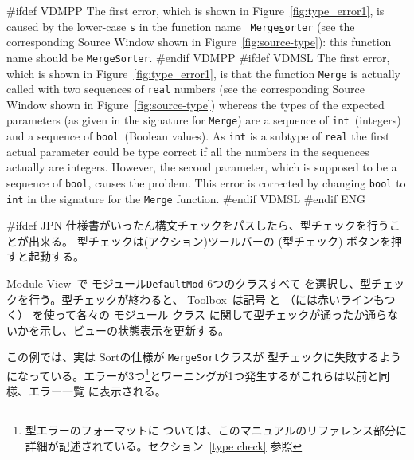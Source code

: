 \documentclass[\pformat,12pt]{article}
\newcommand{\Toolbox}{Toolbox}
\newcommand{\vdmModView}{\guicmd{Module View}}
\newcommand{\vdmModView}{\guicmd{モジュールビュー}}
\newcommand{\Toolbox}{Toolbox}
\newcommand{\vdmModView}{\guicmd{VDM View}}
\newcommand{\vdmModView}{\guicmd{VDMビュー}}
\newcommand{\guicmd}[1]{{\sf #1}}
\newcommand{\guicmd}[1]{{\gt #1}}
\begin{document}
#ifdef VDMPP
The first error, which is shown in Figure~\ref{fig:type_error1}, is
caused by the lower-case {\tt s} in the function name {\tt
  Merge\underline{s}orter} (see the corresponding \guicmd{Source Window} shown in
Figure~\ref{fig:source-type}): this function name should be {\tt MergeSorter}.
#endif VDMPP
#ifdef VDMSL 
The first error, which is shown in Figure~\ref{fig:type_error1},
is that the function {\tt Merge} is actually  called with two sequences of
{\tt real} numbers (see the corresponding \guicmd{Source Window} shown in
Figure~\ref{fig:source-type}) whereas the types of the expected
parameters (as given in the signature for 
{\tt Merge}) are a sequence of {\tt int}~(integers) and a sequence of
{\tt bool}~(Boolean values). As {\tt int} is a subtype of {\tt real}
the first actual parameter could be type correct if all
the numbers in the sequences actually are integers. However, the
second parameter, which is supposed to be a sequence of {\tt bool},
causes the problem.  This error is corrected by changing {\tt bool} to
{\tt int} in the signature for the {\tt Merge} function.
#endif VDMSL
#endif ENG

#ifdef JPN
仕様書がいったん構文チェックをパスしたら、型チェックを行うことが出来る。
型チェックは(\guicmd{アクション})ツールバーの  
(\guicmd{型チェック}) ボタンを押すと起動する。

\vdmModView\ で 
{
モジュール{\tt DefaultMod}
}
{
6つのクラスすべて
} 
を選択し、型チェックを行う。型チェックが終わると、 \Toolbox\ は記号
と
（には赤いラインもつく）
を使って各々の
{
モジュール
}
{
クラス
}に関して型チェックが通ったか通らないかを示し、ビューの状態表示を更新する。

この例では、実は
{
Sortの仕様が
}
{
{\tt MergeSort}クラスが
}
型チェックに失敗するようになっている。エラーが3つ\footnote{型エラーのフォーマットに
ついては、このマニュアルのリファレンス部分に詳細が記述されている。セクション~\ref{type check}
参照 }とワーニングが1つ発生するがこれらは以前と同様、\guicmd{エラー一覧} に表示される。
\end{document}
